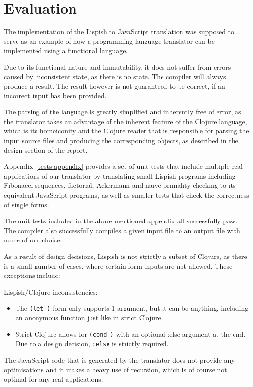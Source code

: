 \chapter{Evaluation}
The implementation of the Lispish to JavaScript translation was supposed to serve as an example of how a programming language translator can be implemented using a functional language.

Due to its functional nature and immutability, it does not suffer from errors caused by inconsistent state, as there is no state. 
The compiler will always produce a result. The result however is not guaranteed to be correct, if an incorrect input has been provided.

The parsing of the language is greatly simplified and inherently free of error, as the translator takes an advantage of the inherent feature of the Clojure language, which is its homoiconity and the Clojure reader that is responsible for parsing the input source files and producing the corresponding objects, as described in the design section of the report.

Appendix~\ref{tests-appendix} provides a set of unit tests that include multiple real applications of our translator by translating small Lispish programs including Fibonacci sequences, factorial, Ackermann and naive primality checking to its equivalent JavaScript programs, as well as smaller tests that check the correctness of single forms.

The unit tests included in the above mentioned appendix all successfully pass.
The compiler also successfully compiles a given input file to an output file with name of our choice. 

As a result of design decisions, Lispish is not strictly a subset of Clojure, as there is a small number of cases, where certain form inputs are not allowed.
These exceptions include:

\noindent Lispish/Clojure inconsistencies:

\begin{itemize}
\item The \texttt{(let )} form only supports 1 argument, but it can be anything, including an anonymous function just like in strict Clojure.
\item Strict Clojure allows for \texttt{(cond )} with an optional :else argument at the end. Due to a design decision, \texttt{:else} is strictly required.
\end{itemize}


The JavaScript code that is generated by the translator does not provide any optimisations and it makes a heavy use of recursion, which is of course not optimal for any real applications. 

